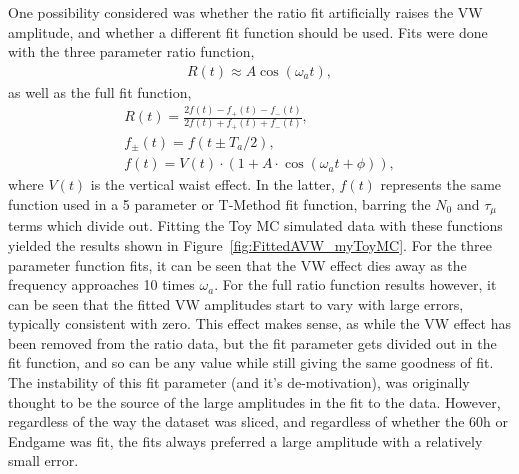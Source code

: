 \documentclass[12pt,letterpaper]{article}
\newcommand{\figref}[1]{Figure~\ref{#1}}
\def\wa{$\omega_{a}$\xspace}
\begin{document}
One possibility considered was whether the ratio fit artificially raises the VW amplitude, and whether a different fit function should be used. Fits were done with the three parameter ratio function,
    \begin{align} \label{eq:threeparamratio}
        R(t) \approx A \cos(\omega_{a}t),
    \end{align}
as well as the full fit function,
    \begin{gather}
        R(t) = \frac{2f(t) - f_{+}(t) - f_{-}(t)}{2f(t) + f_{+}(t) + f_{-}(t)}, \\
        f_{\pm}(t) = f(t \pm T_{a}/2), \\
        f(t) = V(t) \cdot (1 + A \cdot \cos(\omega_{a}t + \phi)),
    \label{eq:fullratiofunction}
    \end{gather}
where $V(t)$ is the vertical waist effect. In the latter, $f(t)$ represents the same function used in a 5 parameter or T-Method fit function, barring the $N_{0}$ and $\tau_{\mu}$ terms which divide out. Fitting the Toy MC simulated data with these functions yielded the results shown in \figref{fig:FittedAVW_myToyMC}. For the three parameter function fits, it can be seen that the VW effect dies away as the frequency approaches 10 times \wa. For the full ratio function results however, it can be seen that the fitted VW amplitudes start to vary with large errors, typically consistent with zero. This effect makes sense, as while the VW effect has been removed from the ratio data, but the fit parameter gets divided out in the fit function, and so can be any value while still giving the same goodness of fit. The instability of this fit parameter (and it's de-motivation), was originally thought to be the source of the large amplitudes in the fit to the data. However, regardless of the way the dataset was sliced, and regardless of whether the 60h or Endgame was fit, the fits always preferred a large amplitude with a relatively small error.
\end{document}
